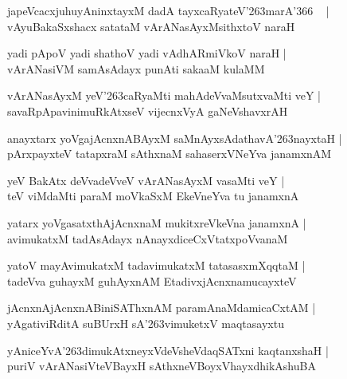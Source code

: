 \documentclass[twoside,12pt,openright]{book}
\def\S{\char'263}
\newcounter{shloka}[chapter]
\begin{document}
\begin{shloka}
japeVcacxjuhuyAninxtayxM dadA tayxcaRyateV\S marA\char'366 ~ |\\
vAyuBakaSxshacx satataM vArANasAyxMsithxtoV naraH 
\end{shloka}

\begin{shloka}
yadi pApoV yadi shathoV yadi vAdhARmiVkoV naraH |\\
vArANasiVM samAsAdayx punAti sakaaM kulaMM
\end{shloka}

\begin{shloka}
vArANasAyxM yeV\S caRyaMti mahAdeVvaMsutxvaMti veY |\\
savaRpApavinimuRkAtxseV vijecnxVyA gaNeVshavxrAH 
\end{shloka}

\begin{shloka}
anayxtarx yoVgajAcnxnABAyxM saMnAyxsAdathavA\S nayxtaH |\\
pArxpayxteV tatapxraM sAthxnaM sahaserxVNeYva janamxnAM 
\end{shloka}

\begin{shloka}
yeV BakAtx deVvadeVveV vArANasAyxM vasaMti veY |\\
teV viMdaMti paraM moVkaSxM EkeVneYva tu janamxnA 
\end{shloka}

\begin{shloka}
yatarx yoVgasatxthAjAcnxnaM mukitxreVkeVna janamxnA |\\
avimukatxM tadAsAdayx nAnayxdiceCxVtatxpoVvanaM 
\end{shloka}

\begin{shloka}
yatoV mayAvimukatxM tadavimukatxM tatasasxmXqqtaM |\\
tadeVva guhayxM guhAyxnAM EtadivxjAcnxnamucayxteV 
\end{shloka}

\begin{shloka}
jAcnxnAjAcnxnABiniSAThxnAM  paramAnaMdamicaCxtAM |\\
yAgativiRditA suBUrxH sA\S vimuketxV maqtasayxtu 
\end{shloka}

\begin{shloka}
yAniceYvA\S dimukAtxneyxVdeVsheVdaqSATxni kaqtanxshaH |\\
puriV vArANasiVteVBayxH sAthxneVBoyxVhayxdhikAshuBA
\end{shloka}
\end{document}
